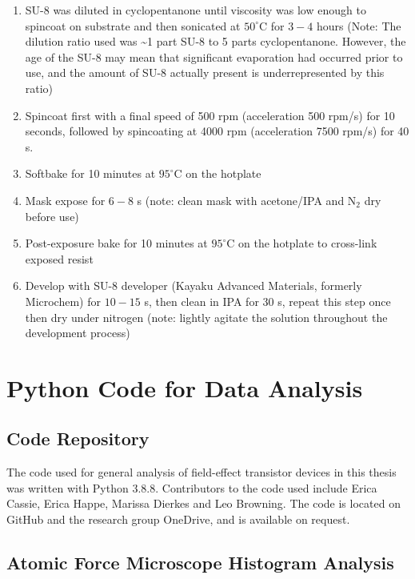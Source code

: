 \documentclass[
  a4paper,
]{scrbook}
\begin{document}
\begin{enumerate}
\def\labelenumi{\arabic{enumi}.}
\item
  SU-8 was diluted in cyclopentanone until viscosity was low enough to
  spincoat on substrate and then sonicated at \(50^\circ\)C for \(3-4\)
  hours (Note: The dilution ratio used was \textasciitilde1 part SU-8 to
  5 parts cyclopentanone. However, the age of the SU-8 may mean that
  significant evaporation had occurred prior to use, and the amount of
  SU-8 actually present is underrepresented by this ratio)
\item
  Spincoat first with a final speed of 500 rpm (acceleration 500 rpm/s)
  for 10 seconds, followed by spincoating at 4000 rpm (acceleration 7500
  rpm/s) for 40 s.
\item
  Softbake for 10 minutes at \(95^\circ\)C on the hotplate
\item
  Mask expose for \(6-8\) s (note: clean mask with acetone/IPA and
  N\(_2\) dry before use)
\item
  Post-exposure bake for 10 minutes at \(95^\circ\)C on the hotplate to
  cross-link exposed resist
\item
  Develop with SU-8 developer (Kayaku Advanced Materials, formerly
  Microchem) for \(10-15\) s, then clean in IPA for 30 s, repeat this
  step once then dry under nitrogen (note: lightly agitate the solution
  throughout the development process)
\end{enumerate}

\hypertarget{sec-python}{%
\chapter{Python Code for Data Analysis}\label{sec-python}}

\hypertarget{code-repository}{%
\section{Code Repository}\label{code-repository}}

The code used for general analysis of field-effect transistor devices in
this thesis was written with Python 3.8.8. Contributors to the code used
include Erica Cassie, Erica Happe, Marissa Dierkes and Leo Browning. The
code is located on GitHub and the research group OneDrive, and is
available on request.

\hypertarget{sec-histogram-analysis}{%
\section{Atomic Force Microscope Histogram
Analysis}\label{sec-histogram-analysis}}
\end{document}
